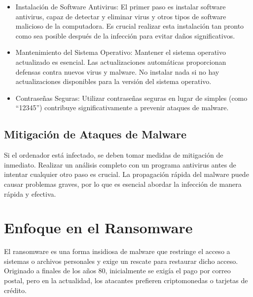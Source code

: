 \documentclass[letterpaper, 12pt]{article}
\begin{document}
\begin{itemize}[label=$\diamond$]
    \item Instalación de Software Antivirus: El primer paso es
          instalar software antivirus, capaz de detectar y eliminar
          virus y otros tipos de software malicioso de la
          computadora. Es crucial realizar esta instalación tan
          pronto como sea posible después de la infección para evitar
          daños significativos.

    \item Mantenimiento del Sistema Operativo: Mantener el sistema
          operativo actualizado es esencial. Las actualizaciones
          automáticas proporcionan defensas contra nuevos virus y
          malware. No instalar nada si no hay actualizaciones
          disponibles para la versión del sistema operativo.

    \item Contraseñas Seguras: Utilizar contraseñas seguras en lugar
          de simples (como ``12345'') contribuye significativamente a
          prevenir ataques de malware.
\end{itemize}

\subsection{Mitigación de Ataques de Malware}

Si el ordenador está infectado, se deben tomar medidas de
mitigación de inmediato. Realizar un análisis completo con
un programa antivirus antes de intentar cualquier otro paso
es crucial. La propagación rápida del malware puede causar
problemas graves, por lo que es esencial abordar la
infección de manera rápida y efectiva.

\section{Enfoque en el Ransomware}

El ransomware es una forma insidiosa de malware que
restringe el acceso a sistemas o archivos personales y
exige un rescate para restaurar dicho acceso. Originado a
finales de los años 80, inicialmente se exigía el pago por
correo postal, pero en la actualidad, los atacantes
prefieren criptomonedas o tarjetas de crédito.

\end{document}
